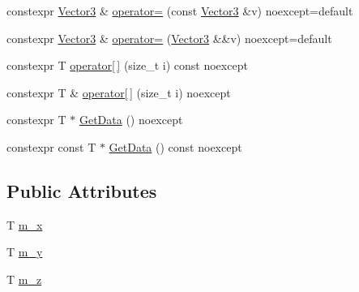 \begin{DoxyCompactItemize}
\item 
constexpr \hyperlink{structmage_1_1_vector3}{Vector3} \& \hyperlink{structmage_1_1_vector3_3_01_t_00_01typename_01std_1_1enable__if__t_3_01std_1_1is__arithmetic__v_3_01_t_01_4_00_01void_01_4_01_4_aea3b9f40f77d37ac6fcdb86cc444855e}{operator=} (const \hyperlink{structmage_1_1_vector3}{Vector3} \&v) noexcept=default
\item 
constexpr \hyperlink{structmage_1_1_vector3}{Vector3} \& \hyperlink{structmage_1_1_vector3_3_01_t_00_01typename_01std_1_1enable__if__t_3_01std_1_1is__arithmetic__v_3_01_t_01_4_00_01void_01_4_01_4_a844583be5dde6efeffec03590df850be}{operator=} (\hyperlink{structmage_1_1_vector3}{Vector3} \&\&v) noexcept=default
\item 
constexpr T \hyperlink{structmage_1_1_vector3_3_01_t_00_01typename_01std_1_1enable__if__t_3_01std_1_1is__arithmetic__v_3_01_t_01_4_00_01void_01_4_01_4_a695960509f255bb3d6df62f26c712018}{operator\mbox{[}$\,$\mbox{]}} (size\+\_\+t i) const noexcept
\item 
constexpr T \& \hyperlink{structmage_1_1_vector3_3_01_t_00_01typename_01std_1_1enable__if__t_3_01std_1_1is__arithmetic__v_3_01_t_01_4_00_01void_01_4_01_4_aa61b53758e35b40b4237e56db9bd5ca7}{operator\mbox{[}$\,$\mbox{]}} (size\+\_\+t i) noexcept
\item 
constexpr T $\ast$ \hyperlink{structmage_1_1_vector3_3_01_t_00_01typename_01std_1_1enable__if__t_3_01std_1_1is__arithmetic__v_3_01_t_01_4_00_01void_01_4_01_4_a126f56252c9621850e4b857efc390ba2}{Get\+Data} () noexcept
\item 
constexpr const T $\ast$ \hyperlink{structmage_1_1_vector3_3_01_t_00_01typename_01std_1_1enable__if__t_3_01std_1_1is__arithmetic__v_3_01_t_01_4_00_01void_01_4_01_4_a9565d50c89cae32d0219c2afae663f3f}{Get\+Data} () const noexcept
\end{DoxyCompactItemize}
\subsection*{Public Attributes}
\begin{DoxyCompactItemize}
\item 
T \hyperlink{structmage_1_1_vector3_3_01_t_00_01typename_01std_1_1enable__if__t_3_01std_1_1is__arithmetic__v_3_01_t_01_4_00_01void_01_4_01_4_ab495c6012997584b577b5cc55299c981}{m\+\_\+x}
\item 
T \hyperlink{structmage_1_1_vector3_3_01_t_00_01typename_01std_1_1enable__if__t_3_01std_1_1is__arithmetic__v_3_01_t_01_4_00_01void_01_4_01_4_af516e5a5374c3fd193ed43819b447d79}{m\+\_\+y}
\item 
T \hyperlink{structmage_1_1_vector3_3_01_t_00_01typename_01std_1_1enable__if__t_3_01std_1_1is__arithmetic__v_3_01_t_01_4_00_01void_01_4_01_4_aaded1e162ec0b3c6a79d0a010b36f30c}{m\+\_\+z}
\end{DoxyCompactItemize}


